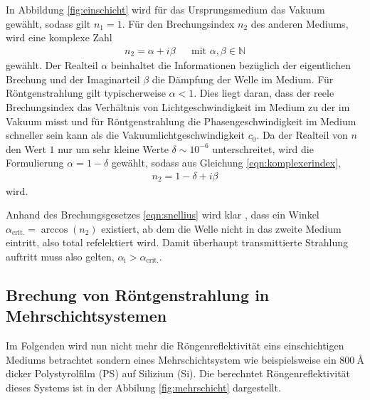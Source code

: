 In Abbildung \ref{fig:einschicht} wird für das Ursprungsmedium das Vakuum gewählt,
sodass gilt $n_{1} = 1$. Für den Brechungsindex $n_{2}$ des anderen Mediums,
wird eine komplexe Zahl
\begin{align}
  n_{2} = \alpha + i \beta& &\text{mit } \alpha, \beta \in \mathbb{N}
  \label{eqn:komplexerindex}
\end{align}
gewählt. Der Realteil $\alpha$ beinhaltet die Informationen bezüglich der eigentlichen
Brechung und der Imaginarteil $\beta$ die Dämpfung der Welle im Medium. Für Röntgenstrahlung
gilt typischerweise $\alpha < 1$. Dies liegt daran, dass der reele
Brechungsindex das Verhältnis von Lichtgeschwindigkeit im Medium zu der im Vakuum
misst und für Röntgenstrahlung die Phasengeschwindigkeit im Medium
schneller sein kann als die Vakuumlichtgeschwindigkeit $c_{0}$.
Da der Realteil von $n$ den Wert $1$ nur um sehr kleine Werte
$\delta \sim 10^{-6}$ unterschreitet, wird die Formulierung
$\alpha = 1 - \delta$ gewählt,
sodass aus Gleichung \eqref{eqn:komplexerindex},
\begin{align}
  n_{2} = 1 - \delta + i \beta
  \label{eqn:komplexerindexdelta}
\end{align}
wird.

Anhand des Brechungsgesetzes \eqref{eqn:snellius} wird klar , dass ein Winkel
$\alpha_\text{{crit.}} = \arccos\left( n_{2} \right)$ existiert,
ab dem die Welle nicht in das zweite Medium eintritt,
also total refelektiert wird.
Damit überhaupt transmittierte Strahlung auftritt muss also gelten,
$\alpha_{\text{i}} > \alpha_{\text{crit.}}$.





\subsection{Brechung von Röntgenstrahlung in Mehrschichtsystemen}
\label{subsec:mehrschicht}
Im Folgenden wird nun nicht mehr 
die Röngenreflektivität
eins einschichtigen 
Mediums betrachtet sondern eines Mehrschichtsystem wie 
beispielsweise ein $\SI{800}{\angstrom}$ dicker Polystyrolfilm (PS) 
auf Silizium (Si). Die berechntet Röngenreflektivität dieses 
Systems ist in der Abbilung \ref{fig:mehrschicht} dargestellt. 

